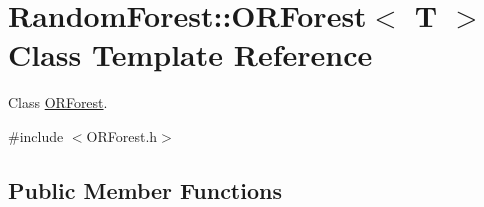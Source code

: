 \hypertarget{class_random_forest_1_1_o_r_forest}{}\section{Random\+Forest\+:\+:O\+R\+Forest$<$ T $>$ Class Template Reference}
\label{class_random_forest_1_1_o_r_forest}


Class \hyperlink{class_random_forest_1_1_o_r_forest}{O\+R\+Forest}.  




{\ttfamily \#include $<$O\+R\+Forest.\+h$>$}

\subsection*{Public Member Functions}
